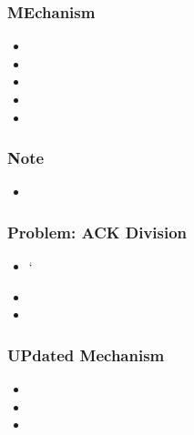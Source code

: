 \subsubsection{MEchanism}
\begin{itemize}
	\item
	\item
	\item
	\item
	\item
\end{itemize}
\subsubsection{Note}
\begin{itemize}
	\item
\end{itemize}
\subsubsection{Problem: ACK Division}
\begin{itemize}
	\item `
	\item
	\item
\end{itemize}
\subsubsection{UPdated Mechanism}
\begin{itemize}
	\item
	\item
	\item
\end{itemize}
